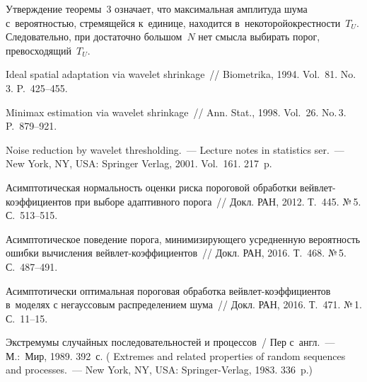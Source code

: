 \begin{multicols}{2}
\smallskip

Утверждение теоремы~3 означает, что макси\-маль\-ная амплитуда шума с~вероятностью, 
стре\-мящейся к~единице, находится в~некоторой\linebreak окрест\-ности~$T_U$. Следовательно, при 
достаточно большом~$N$ нет смысла выбирать порог, превосходящий~$T_U$.


{\small\frenchspacing
 {%
 \begin{thebibliography}{9}
 Ideal spatial adaptation via wavelet shrinkage~// 
Bio\-met\-ri\-ka, 1994. Vol.~81. No.\,3. P.~425--455.


 Minimax estimation via wavelet shrinkage~// 
Ann. Stat., 1998. Vol.~26. No.\,3. P.~879--921.

 Noise reduction by wavelet thresholding.~--- 
Lecture notes in statistics ser.~--- 
New York, NY, USA: Springer Verlag, 2001.  Vol.~161. 217~p.

 Асимптотическая нормальность оценки риска пороговой обработки 
вейв\-лет-ко\-эф\-фи\-ци\-ен\-тов при выборе адаптивного порога~// Докл. 
РАН, 2012. Т.~445. №\,5. С.~513--515.

 Асимптотическое поведение порога, 
минимизирующего усредненную вероятность ошибки вычисления вейв\-лет-ко\-эф\-фи\-ци\-ен\-тов~// 
Докл. РАН, 2016. Т.~468. №\,5. С.~487--491.

Асимптотически оптимальная пороговая обработка вейв\-лет-ко\-эф\-фи\-ци\-ен\-тов 
в~моделях с негауссовым распределением шума~// Докл. РАН, 2016. Т.~471. №\,1. С.~11--15.

Экстремумы случайных последовательностей и процессов~/
Пер с~англ.~--- М.:~Мир, 1989. 392~с.
( 
{Extremes and related properties of random sequences and processes.}~--- 
New York, NY, USA: Springer-Verlag, 1983. 336~p.)

 \end{thebibliography}

 }
 }

\end{multicols}

\vspace*{-3pt}

